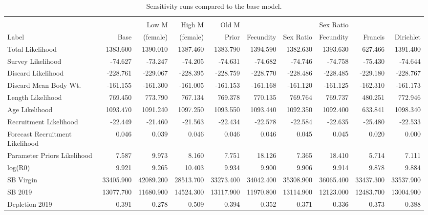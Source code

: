 \documentclass[12pt,]{article}
\begin{document}
\begin{landscape}
\begingroup\fontsize{9pt}{10pt}\selectfont
\begin{longtable}{lrrrrrrrrr}
\caption{Sensitivity runs compared to the base model.} \\ 
  \hline
 &  &  &  &  &  &  &  &  &  \\ 
        &      & Low M    & High M   &  Old M  &           &            & Sex Ratio &          &          \\
 Label & Base & (female) & (female) &  Prior  & Fecundity &  Sex Ratio & Fecundity & Francis & Dirichlet \\
 \hline
Total Likelihood & 1383.600 & 1390.010 & 1387.460 & 1383.790 & 1394.590 & 1382.630 & 1393.630 & 627.466 & 1391.400 \\ 
  Survey Likelihood & -74.627 & -73.247 & -74.205 & -74.631 & -74.682 & -74.746 & -74.758 & -75.430 & -74.644 \\ 
  Discard Likelihood & -228.761 & -229.067 & -228.395 & -228.759 & -228.770 & -228.486 & -228.485 & -229.180 & -228.767 \\ 
  Discard Mean Body Wt. & -161.155 & -161.300 & -161.005 & -161.153 & -161.168 & -161.120 & -161.125 & -162.310 & -161.173 \\ 
  Length Likelihood & 769.450 & 773.790 & 767.134 & 769.378 & 770.135 & 769.764 & 769.737 & 480.251 & 772.946 \\ 
  Age Likelihood & 1093.470 & 1091.240 & 1097.250 & 1093.550 & 1093.440 & 1092.350 & 1092.400 & 633.841 & 1098.340 \\ 
  Recruitment Likelihood & -22.449 & -21.460 & -21.563 & -22.434 & -22.578 & -22.584 & -22.635 & -25.480 & -22.533 \\ 
  Forecast Recruitment Likelihood & 0.046 & 0.039 & 0.046 & 0.046 & 0.046 & 0.045 & 0.045 & 0.020 & 0.000 \\ 
  Parameter Priors Likelihood & 7.587 & 9.973 & 8.160 & 7.751 & 18.126 & 7.365 & 18.410 & 5.714 & 7.111 \\ 
  log(R0) & 9.921 & 9.265 & 10.403 & 9.934 & 9.900 & 9.906 & 9.914 & 9.878 & 9.884 \\ 
  SB Virgin & 33405.900 & 42089.200 & 28513.700 & 33273.400 & 34042.400 & 35308.900 & 36065.400 & 33437.300 & 33537.900 \\ 
  SB 2019 & 13077.700 & 11680.900 & 14524.300 & 13117.900 & 11970.800 & 13114.900 & 12123.000 & 12483.700 & 13004.900 \\ 
  Depletion 2019 & 0.391 & 0.278 & 0.509 & 0.394 & 0.352 & 0.371 & 0.336 & 0.373 & 0.388 \\ 

\end{longtable}
\end{landscape}
\end{document}
